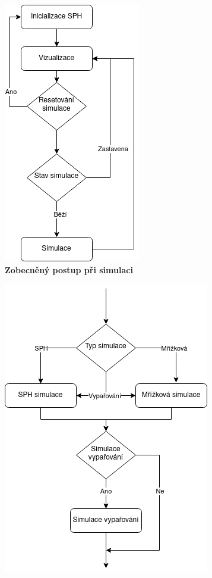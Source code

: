 \begin{figure}[h]
	\centering
	\captionsetup{justification=centering}
	\begin{subfigure}[t]{.5\textwidth}
			\centering
        	\includegraphics[scale=0.6]{obrazky-figures/SimFlow.png}
        	\caption{\textbf{Zobecněný postup při simulaci}}
        	\label{fig:simflow}
	\end{subfigure}%
	\begin{subfigure}[t]{.5\textwidth}
		\centering
		\includegraphics[scale=0.6]{obrazky-figures/SimTypeFLow.png}

\end{subfigure}
\end{figure}
